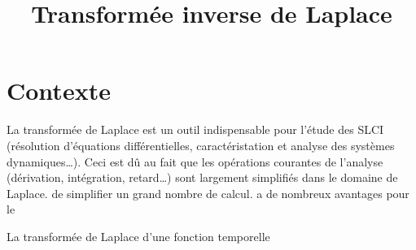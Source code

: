 \documentclass[a4paper,12pt]{scrartcl}
\title{Transformée inverse de Laplace}
\date{}
\begin{document}
\maketitle

\section{Contexte}
\label{sec:contexte}

La transformée de Laplace est un outil indispensable 
pour l'étude des SLCI (résolution d'équations différentielles, caractéristation et analyse 
des systèmes dynamiques\ldots). Ceci est dû au fait que les opérations courantes 
de l'analyse (dérivation, intégration, retard\ldots) sont largement simplifiés dans
le domaine de Laplace. 
de simplifier un grand nombre de calcul. 
a de nombreux avantages 
pour le

La transformée de Laplace d'une fonction temporelle
\end{document}
